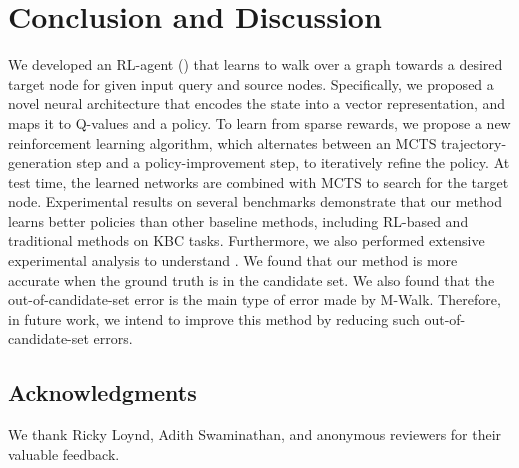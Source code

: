 \documentclass{article}
\begin{document}
	
	\section{Conclusion and Discussion}
	\label{Sec:Conclusion}
	
	We developed an RL-agent (\modelname) that learns to walk over a graph towards a desired target node for given input query and source nodes. Specifically, we proposed a novel neural architecture that encodes the state into a vector representation, and maps it to Q-values and a policy. To learn from sparse rewards, we propose a new reinforcement learning algorithm, which alternates between an MCTS trajectory-generation step and a policy-improvement step, to iteratively refine the policy. At test time, the learned networks are combined with MCTS to search for the target node. Experimental results on several benchmarks demonstrate that our method learns better policies than other baseline methods, including RL-based and traditional methods on KBC tasks. Furthermore, we also performed extensive experimental analysis to understand \modelname. We found that our method is more accurate when the ground truth is in the candidate set. We also found that the out-of-candidate-set error is the main type of error made by M-Walk. Therefore, in future work, we intend to improve this method by reducing such out-of-candidate-set errors.
	
	\subsection*{Acknowledgments}
    We thank Ricky Loynd, Adith Swaminathan, and anonymous reviewers for their valuable feedback.


	
	
	
	
	\clearpage
	
	
	
\end{document}
